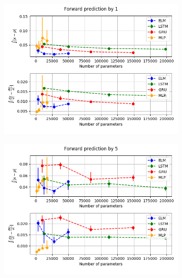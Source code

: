 \documentclass[11pt]{article}
\begin{document}
  \begin{figure}
    \begin{center}
      \begin{subfigure}{.48\textwidth}
        \includegraphics[width=\textwidth]{figures/mg1_scatter_1.png}
        \caption{}
      \end{subfigure}
      \begin{subfigure}{.48\textwidth}
        \includegraphics[width=\textwidth]{figures/mg1_scatter_5.png}
        \caption{}
      \end{subfigure}
      \begin{subfigure}{.48\textwidth}

\end{subfigure}
\end{center}
\end{figure}
\end{document}

